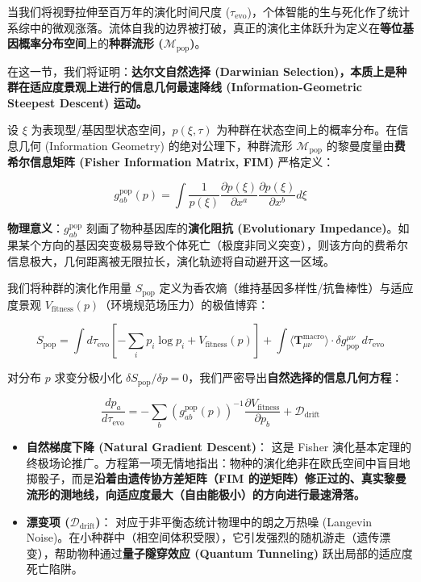 当我们将视野拉伸至百万年的演化时间尺度 ($\tau_{\text{evo}}$)，个体智能的生与死化作了统计系综中的微观涨落。流体自我的边界被打破，真正的演化主体跃升为定义在\textbf{等位基因概率分布空间}上的\textbf{种群流形 ($\mathcal{M}_{\text{pop}}$)}。

在这一节，我们将证明：\textbf{达尔文自然选择 (Darwinian Selection)，本质上是种群在适应度景观上进行的信息几何最速降线 (Information-Geometric Steepest Descent) 运动。}


设 $\xi$ 为表现型/基因型状态空间，$p(\xi, \tau)$ 为种群在状态空间上的概率分布。在信息几何 (Information Geometry) 的绝对公理下，种群流形 $\mathcal{M}_{\text{pop}}$ 的黎曼度量由\textbf{费希尔信息矩阵 (Fisher Information Matrix, FIM)} 严格定义：

\begin{equation}
    g^{\text{pop}}_{ab}(p) = \int \frac{1}{p(\xi)} \frac{\partial p(\xi)}{\partial x^a} \frac{\partial p(\xi)}{\partial x^b} d\xi
\end{equation}

\textbf{物理意义}：$g^{\text{pop}}_{ab}$ 刻画了物种基因库的\textbf{演化阻抗 (Evolutionary Impedance)}。如果某个方向的基因突变极易导致个体死亡（极度非同义突变），则该方向的费希尔信息极大，几何距离被无限拉长，演化轨迹将自动避开这一区域。


我们将种群的演化作用量 $S_{\text{pop}}$ 定义为香农熵（维持基因多样性/抗鲁棒性）与适应度景观 $V_{\text{fitness}}(p)$（环境规范场压力）的极值博弈：

\begin{equation}
    S_{\text{pop}} = \int d\tau_{\text{evo}} \left[ -\sum_i p_i \log p_i + V_{\text{fitness}}(p) \right] + \int \langle \mathbf{T}_{\mu\nu}^{\text{macro}} \rangle \cdot \delta g^{\mu\nu}_{\text{pop}} \, d\tau_{\text{evo}}
\end{equation}

对分布 $p$ 求变分极小化 $\delta S_{\text{pop}}/\delta p = 0$，我们严密导出\textbf{自然选择的信息几何方程}：

\begin{equation}
    \boxed{ \frac{dp_a}{d\tau_{\text{evo}}} = -\sum_b \left( g^{\text{pop}}_{ab}(p) \right)^{-1} \frac{\partial V_{\text{fitness}}}{\partial p_b} + \mathcal{D}_{\text{drift}} }
\end{equation}

\begin{itemize}
    \item \textbf{\textcolor{structurecolor}{自然梯度下降 (Natural Gradient Descent)}}：
    这是 Fisher 演化基本定理的终极场论推广。方程第一项无情地指出：物种的演化绝非在欧氏空间中盲目地掷骰子，而是\textbf{沿着由遗传协方差矩阵（FIM 的逆矩阵）修正过的、真实黎曼流形的测地线，向适应度最大（自由能极小）的方向进行最速滑落。}
    \item \textbf{\textcolor{structurecolor}{漂变项 ($\mathcal{D}_{\text{drift}}$)}}：
    对应于非平衡态统计物理中的朗之万热噪 (Langevin Noise)。在小种群中（相空间体积受限），它引发强烈的随机游走（遗传漂变），帮助物种通过\textbf{量子隧穿效应 (Quantum Tunneling)} 跃出局部的适应度死亡陷阱。
\end{itemize}

